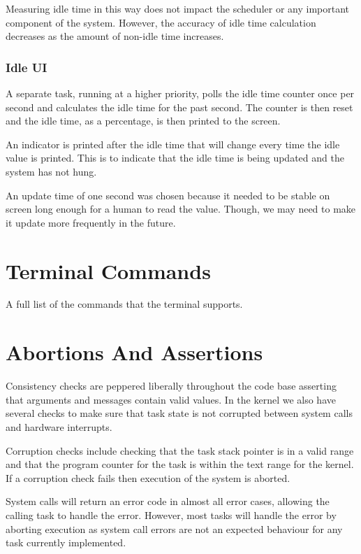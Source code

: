 \documentclass[pdftex,10pt,a4paper]{article}
\begin{document}
Measuring idle time in this way does not impact the scheduler or any
important component of the system. However, the accuracy of idle time
calculation decreases as the amount of non-idle time increases.

\subsubsection*{Idle UI}

A separate task, running at a higher priority, polls the idle time
counter once per second and calculates the idle time for the past
second. The counter is then reset and the idle time, as a percentage,
is then printed to the screen.

An indicator is printed after the idle time that will change every
time the idle value is printed. This is to indicate that the idle time
is being updated and the system has not hung.

An update time of one second was chosen because it needed to be stable
on screen long enough for a human to read the value. Though, we may
need to make it update more frequently in the future.

\section*{Terminal Commands}

A full list of the commands that the terminal supports.

\section*{Abortions And Assertions}

Consistency checks are peppered liberally throughout the code base
asserting that arguments and messages contain valid values. In the
kernel we also have several checks to make sure that task state is not
corrupted between system calls and hardware interrupts.

Corruption checks include checking that the task stack pointer is in a
valid range and that the program counter for the task is within the
text range for the kernel. If a corruption check fails then execution
of the system is aborted.

System calls will return an error code in almost all error cases,
allowing the calling task to handle the error. However, most tasks
will handle the error by aborting execution as system call errors are
not an expected behaviour for any task currently implemented.
\end{document}
